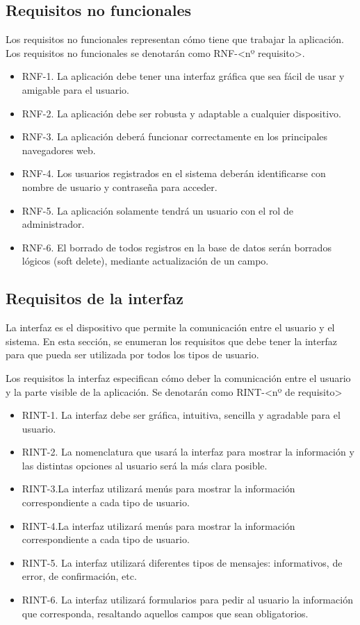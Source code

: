 \subsection{Requisitos no funcionales}\label{sec:requisitos-no-funcionales}

Los requisitos no funcionales representan cómo tiene que trabajar la aplicación. Los requisitos no funcionales se denotarán como RNF-<nº requisito>.

\begin{itemize}
    \item RNF-1. La aplicación debe tener una interfaz gráfica que sea fácil de usar y amigable para el usuario.
    \item RNF-2. La aplicación debe ser robusta y adaptable a cualquier dispositivo.
    \item RNF-3. La aplicación deberá funcionar correctamente en los principales navegadores web.
    \item RNF-4. Los usuarios registrados en el sistema deberán identificarse con nombre de usuario y contraseña para acceder.
    \item RNF-5. La aplicación solamente tendrá un usuario con el rol de administrador.
    \item RNF-6. El borrado de todos registros en la base de datos serán borrados lógicos (soft delete), mediante actualización de un campo.
\end{itemize}


\subsection{Requisitos de la interfaz}\label{sec:requisitos-interfaz}
  
  La interfaz es el dispositivo que permite la comunicación entre el usuario y el sistema. En esta sección, se enumeran los requisitos que debe tener la interfaz para que pueda ser utilizada por todos los tipos de usuario.
  
  Los requisitos la interfaz  especifican cómo deber la comunicación entre el usuario y la parte visible de la aplicación. Se denotarán como RINT-<nº de requisito> 


\begin{itemize}
    \item RINT-1. La interfaz debe ser gráfica, intuitiva, sencilla y agradable para el usuario.
    \item RINT-2. La nomenclatura que usará la interfaz para mostrar la información y las distintas opciones al usuario será la más clara posible.
    \item RINT-3.La interfaz utilizará menús para mostrar la información correspondiente a cada tipo de usuario.    
    \item RINT-4.La interfaz utilizará menús para mostrar la información correspondiente a cada tipo de usuario.
    \item RINT-5. La interfaz utilizará diferentes tipos de mensajes: informativos, de error, de confirmación, etc.
    \item RINT-6. La interfaz utilizará formularios para pedir al usuario la información que corresponda, resaltando aquellos campos que sean obligatorios.
\end{itemize}

